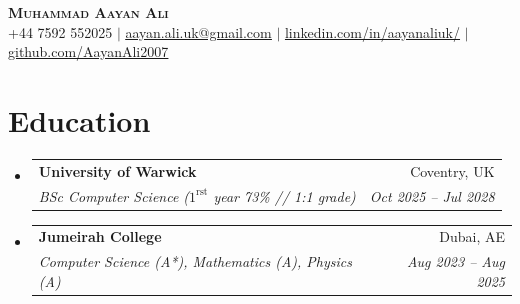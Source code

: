 \documentclass[letterpaper,11pt]{article}
\makeatletter
\newcommand{\resumeSubheading}[4]{
  \vspace{-2pt}\item
    \begin{tabular*}{0.97\textwidth}[t]{l@{\extracolsep{\fill}}r}
      \textbf{#1} & #2 \\
      \textit{\small#3} & \textit{\small #4} \\
    \end{tabular*}\vspace{-7pt}
}
\newcommand{\resumeSubHeadingListStart}{\begin{itemize}[leftmargin=0.15in, label={}]}
\newcommand{\resumeSubHeadingListEnd}{\end{itemize}}
\makeatother
\begin{document}

\begin{center}
    \textbf{\Huge \scshape Muhammad Aayan Ali} \\ \vspace{1pt}
    \small +44 7592 552025 $|$ 
    \href{mailto:aayan.ali.uk@gmail.com}{\underline{aayan.ali.uk@gmail.com}} $|$ 
    \href{https://www.linkedin.com/in/aayanaliuk/}{\underline{linkedin.com/in/aayanaliuk/}} $|$
    \href{https://github.com/AayanAli2007}{\underline{github.com/AayanAli2007}}
\end{center}



\section{Education}
  \resumeSubHeadingListStart
    \resumeSubheading
      {University of Warwick}{Coventry, UK}
      {BSc Computer Science ($1^{\text{rst}}$ year 73\% // 1:1 grade)}{Oct 2025 -- Jul 2028}
    \resumeSubheading
      {Jumeirah College}{Dubai, AE}
      {Computer Science (A*), Mathematics (A), Physics (A)}{Aug 2023 -- Aug 2025}
  \resumeSubHeadingListEnd


\end{document}
